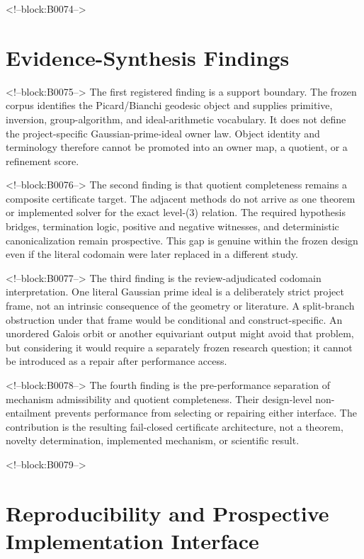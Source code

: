 \documentclass[11pt,a4paper]{article}
\begin{document}
<!--block:B0074-->
\section{Evidence-Synthesis Findings}

<!--block:B0075-->
The first registered finding is a support boundary. The frozen corpus identifies the Picard/Bianchi geodesic object and supplies primitive, inversion, group-algorithm, and ideal-arithmetic vocabulary. It does not define the project-specific Gaussian-prime-ideal owner law. Object identity and terminology therefore cannot be promoted into an owner map, a quotient, or a refinement score.

<!--block:B0076-->
The second finding is that quotient completeness remains a composite certificate target. The adjacent methods do not arrive as one theorem or implemented solver for the exact level-(3) relation. The required hypothesis bridges, termination logic, positive and negative witnesses, and deterministic canonicalization remain prospective. This gap is genuine within the frozen design even if the literal codomain were later replaced in a different study.

<!--block:B0077-->
The third finding is the review-adjudicated codomain interpretation. One literal Gaussian prime ideal is a deliberately strict project frame, not an intrinsic consequence of the geometry or literature. A split-branch obstruction under that frame would be conditional and construct-specific. An unordered Galois orbit or another equivariant output might avoid that problem, but considering it would require a separately frozen research question; it cannot be introduced as a repair after performance access.

<!--block:B0078-->
The fourth finding is the pre-performance separation of mechanism admissibility and quotient completeness. Their design-level non-entailment prevents performance from selecting or repairing either interface. The contribution is the resulting fail-closed certificate architecture, not a theorem, novelty determination, implemented mechanism, or scientific result.

<!--block:B0079-->
\section{Reproducibility and Prospective Implementation Interface}
\end{document}
